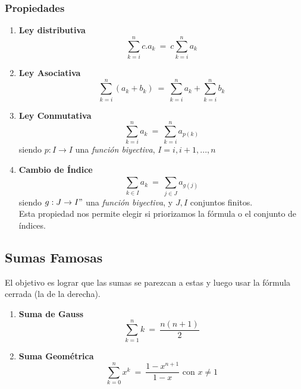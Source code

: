 \documentclass{article}
\newcommand{\eq}{\:=\:}                                 %
\newcommand{\sumatoria}[2]{\sum_{#1} ^{#2}}             %
\begin{document}
\subsubsection*{Propiedades}
\begin{enumerate}
    \item \textbf{Ley distributiva}
    \begin{equation*}
        \sumatoria{k=i}{n} c.a_k \eq c \sumatoria{k=i}{n} a_k
    \end{equation*}
    \item \textbf{Ley Asociativa}
    \begin{equation*}
        \sumatoria{k=i}{n} (a_k + b_k) \eq \sumatoria{k=i}{n} a_k + \sumatoria{k=i}{n} b_k
    \end{equation*}
    \item \textbf{Ley Conmutativa}
    \begin{equation*}
        \sumatoria{k=i}{n} a_k \eq \sumatoria{k=i}{n} a_{p(k)}
    \end{equation*}
    siendo $p: I \rightarrow I$ una \emph{función biyectiva}, $I = {i,i+1,...,n}$
    \item \textbf{Cambio de Índice}
    \begin{equation*}
        \sumatoria{k\in I}{} a_k \eq \sumatoria{j \in J}{} a_{g(j)}
    \end{equation*}
    siendo $g: J \rightarrow I"$ una \emph{función biyectiva}, y $J, I$ conjuntos finitos. 
    \\Esta propiedad nos permite elegir si priorizamos la fórmula o el conjunto de índices.
\end{enumerate}

\subsection{Sumas Famosas}
El objetivo es lograr que las sumas se parezcan a estas y luego usar la fórmula cerrada (la de la derecha).
\begin{enumerate}
    \item \textbf{Suma de Gauss}
    \begin{equation*}
        \sumatoria{k=1}{n} k \eq \frac{n(n+1)}{2}
    \end{equation*}
    \item \textbf{Suma Geométrica}
    \begin{equation*}
        \sumatoria{k=0}{n} x^k \eq \frac{1-x^{n+1}}{1-x} \text{ con } x \neq 1
    \end{equation*}
\end{enumerate}
\end{document}
